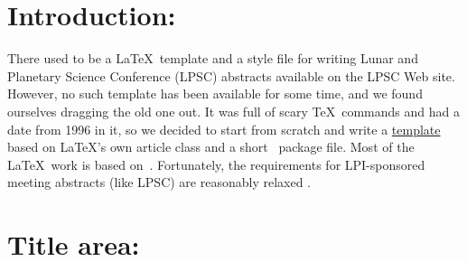 \documentclass[twoside, 10pt]{article}
\begin{document}



%

%

\balance{}

\vspace{4cm}
\section*{Introduction:}
There used to be a \LaTeX\ template and a style file for writing
Lunar and Planetary Science Conference (LPSC) abstracts available
on the LPSC Web site.  However, no such template has been available
for some time, and we found ourselves dragging the old one out.  It
was full of scary \TeX\ commands and had a date from 1996 in it,
so we decided to start from scratch and write a
\href{https://github.com/MosesAstro/LaTeX_Templates/tree/master/LPSCAbstractLaTeXTemplate}{template} based
on \LaTeX's own article class and a short \LaTeXe\ package file.
Most of the \LaTeX\ work is based on~\cite{kopka2003guide}. Fortunately, the 
requirements for LPI-sponsored meeting abstracts (like LPSC)
are reasonably relaxed \citep{LPSC}.

\section*{Title area:}
\end{document}
